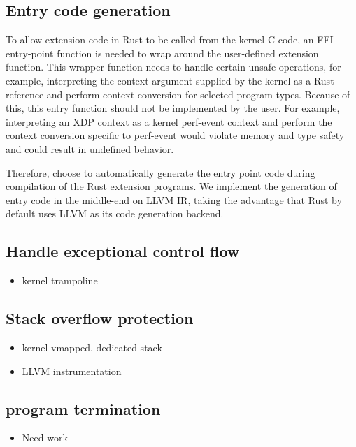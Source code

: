 \subsection{Entry code generation}
To allow \projname{} extension code in Rust to be called from the kernel C
    code, an FFI entry-point function is needed to wrap around the user-defined
    extension function.
This wrapper function needs to handle certain unsafe operations, for example,
    interpreting the context argument supplied by the kernel as a Rust
    reference and perform context conversion for selected program types.
Because of this, this entry function should not be implemented by the user.
For example, interpreting an XDP context as a kernel perf-event context and
    perform the context conversion specific to perf-event would violate memory
    and type safety and could result in undefined behavior.

Therefore, \projname{} choose to automatically generate the entry point code
    during compilation of the Rust extension programs.
We implement the generation of entry code in the middle-end on LLVM IR, taking
    the advantage that Rust by default uses LLVM as its code generation
    backend.

\subsection{Handle exceptional control flow}
\begin{itemize}
    \item kernel trampoline
\end{itemize}

\subsection{Stack overflow protection}
\begin{itemize}
    \item kernel vmapped, dedicated stack
    \item LLVM instrumentation
\end{itemize}

\subsection{program termination}
\begin{itemize}
    \item Need work
\end{itemize}
